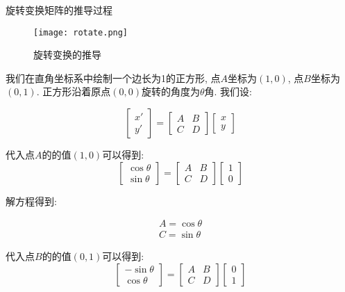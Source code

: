 \begin{titledbox}{旋转变换矩阵的推导过程}
	\begin{figure}[H]
		\centering
		\texttt{[image: rotate.png]}
		\caption{旋转变换的推导}
		\label{fig:shear}
	\end{figure}

我们在直角坐标系中绘制一个边长为1的正方形, 点$A$坐标为$(1,0)$, 点$B$坐标为$(0,1)$. 正方形沿着原点$(0,0)$旋转的角度为$\theta$角. 我们设: 

\begin{equation}
	\begin{bmatrix}x'\\y'\end{bmatrix}=\begin{bmatrix}A&B\\C&D\end{bmatrix}\begin{bmatrix}x\\y\end{bmatrix}
\end{equation}

代入点$A$的的值$(1,0)$可以得到: 
\begin{equation}
	\begin{bmatrix}\cos\theta\\\sin\theta\end{bmatrix}=\begin{bmatrix}A&B\\C&D\end{bmatrix}\begin{bmatrix}1\\0\end{bmatrix}
\end{equation}

解方程得到: 

\begin{equation}
\begin{split}
	A=\cos\theta\\C=\sin\theta
\end{split}
\end{equation}

代入点$B$的的值$(0,1)$可以得到: 
\begin{equation}
	\begin{bmatrix}-\sin\theta\\\cos\theta\end{bmatrix}=\begin{bmatrix}A&B\\C&D\end{bmatrix}\begin{bmatrix}0\\1\end{bmatrix}
\end{equation}


\end{titledbox}
